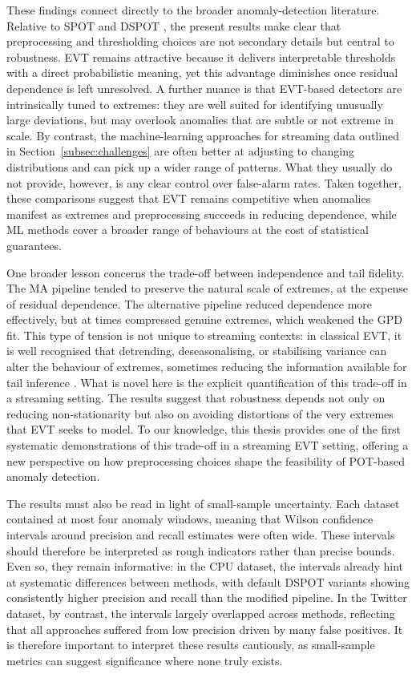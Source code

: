 \documentclass{statsmsc}
\begin{document}
These findings connect directly to the broader anomaly-detection literature. Relative to SPOT and DSPOT 
\citep{siffer2017anomaly}, the present results make clear that preprocessing and thresholding choices are not secondary details
but central to robustness. EVT remains attractive because it delivers interpretable thresholds with a direct probabilistic 
meaning, yet this advantage diminishes once residual dependence is left unresolved. A further nuance is that EVT-based 
detectors are intrinsically tuned to extremes: they are well suited for identifying unusually large deviations, but may 
overlook anomalies that are subtle or not extreme in scale. By contrast, the machine-learning approaches for streaming 
data outlined in Section~\ref{subsec:challenges} are often better at adjusting to changing distributions and can pick up
a wider range of patterns. What they usually do not provide, however, is any clear control over false-alarm rates. Taken
together, these comparisons suggest that EVT remains competitive when anomalies manifest as extremes and preprocessing 
succeeds in reducing dependence, while ML methods cover a broader range of behaviours at the cost of statistical guarantees.

One broader lesson concerns the trade-off between independence and tail fidelity. The MA pipeline tended to preserve the 
natural scale of extremes, at the expense of residual dependence. The alternative pipeline reduced dependence more effectively,
but at times compressed genuine extremes, which weakened the GPD fit. This type of tension is not unique to streaming contexts:
in classical EVT, it is well recognised that detrending, deseasonalising, or stabilising variance can alter the behaviour of 
extremes, sometimes reducing the information available for tail inference \citep{EastoeTawn2009}. What is novel
here is the explicit quantification of this trade-off in a streaming setting. The results suggest that robustness depends not
only on reducing non-stationarity but also on avoiding distortions of the very extremes that EVT seeks to model. To our 
knowledge, this thesis provides one of the first systematic demonstrations of this trade-off in a streaming EVT setting, 
offering a new perspective on how preprocessing choices shape the feasibility of POT-based anomaly detection.

The results must also be read in light of small-sample uncertainty. Each dataset contained at most four anomaly windows, 
meaning that Wilson confidence intervals around precision and recall estimates were often wide. These intervals should 
therefore be interpreted as rough indicators rather than precise bounds. Even so, they remain informative: in the CPU dataset,
the intervals already hint at systematic differences between methods, with default DSPOT variants showing consistently higher
precision and recall than the modified pipeline. In the Twitter dataset, by contrast, the intervals largely overlapped across
methods, reflecting that all approaches suffered from low precision driven by many false positives. It is therefore important
to interpret these results cautiously, as small-sample metrics can suggest significance where none truly exists.
\end{document}
